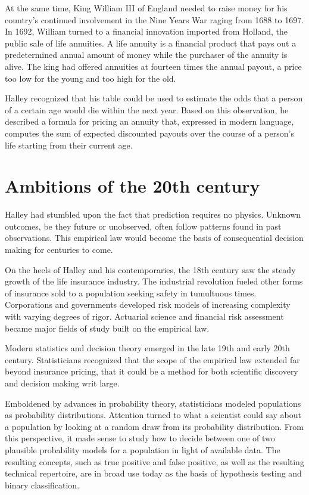 \documentclass{tufte-book}
\begin{document}
At the same time, King William III of England needed to raise money for
his country's continued involvement in the Nine Years War raging from
1688 to 1697. In 1692, William turned to a financial innovation imported
from Holland, the public sale of life annuities. A life annuity is a
financial product that pays out a predetermined annual amount of money
while the purchaser of the annuity is alive. The king had offered
annuities at fourteen times the annual payout, a price too low for the
young and too high for the old.

Halley recognized that his table could be used to estimate the odds that
a person of a certain age would die within the next year. Based on this
observation, he described a formula for pricing an annuity that,
expressed in modern language, computes the sum of expected discounted
payouts over the course of a person's life starting from their current
age.

\hypertarget{ambitions-of-the-20th-century}{%
\section{Ambitions of the 20th
century}\label{ambitions-of-the-20th-century}}

Halley had stumbled upon the fact that prediction requires no physics.
Unknown outcomes, be they future or unobserved, often follow patterns
found in past observations. This empirical law would become the basis of
consequential decision making for centuries to come.

On the heels of Halley and his contemporaries, the 18th century saw the
steady growth of the life insurance industry. The industrial revolution
fueled other forms of insurance sold to a population seeking safety in
tumultuous times. Corporations and governments developed risk models of
increasing complexity with varying degrees of rigor. Actuarial science
and financial risk assessment became major fields of study built on the
empirical law.

Modern statistics and decision theory emerged in the late 19th and early
20th century. Statisticians recognized that the scope of the empirical
law extended far beyond insurance pricing, that it could be a method for
both scientific discovery and decision making writ large.

Emboldened by advances in probability theory, statisticians modeled
populations as probability distributions. Attention turned to what a
scientist could say about a population by looking at a random draw from
its probability distribution. From this perspective, it made sense to
study how to decide between one of two plausible probability models for
a population in light of available data. The resulting concepts, such as
true positive and false positive, as well as the resulting technical
repertoire, are in broad use today as the basis of hypothesis testing
and binary classification.
\end{document}
